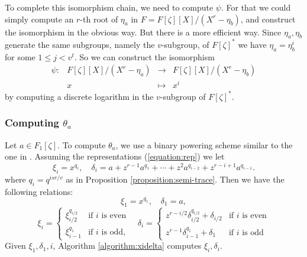 \documentclass[12pt]{article}
\theoremstyle{plain}
\theoremstyle{definition}
\newcounter{algorithm}
\begin{document}
To complete this isomorphism chain, we need to compute $\psi$. For that we could simply compute an 
$r$-th root of $\eta_a$ in $F = F[\zeta][X] / (X^r - \eta_b)$, and construct the 
isomorphism in the obvious way. But there is a more efficient way. Since $\eta_a, \eta_b$ generate 
the same subgroups, namely the $v$-subgroup, of $F[\zeta]^*$ we have $\eta_a = \eta_b^i$ for some 
$1 \le j < v^t$. So we can construct the isomorphism
\begin{equation}
	\label{equation:middle-isom}
	\begin{array}{rrll}
	\psi: & F[\zeta][X] / (X^r - \eta_a) & \longrightarrow & F[\zeta][X] / (X^r - \eta_b) \\
	& x & \longmapsto & x^i
	\end{array}
\end{equation}
by computing a discrete logarithm in the $v$-subgroup of $F[\zeta]^*$.





\subsubsection{Computing $\theta_a$}

Let $a \in F_1[\zeta]$. To compute $\theta_a$, we use a binary powering scheme similar to the one 
in \cite{doliskanischost2011}. Assuming the representations (\ref{equation:rep}) we let 
\[
\xi_i = x^{q_i}, \quad
\delta_i = a + z^{r - 1}a^{q_1} + \cdots + z^2a^{q_{i - 2}} + z^{r - i + 1}a^{q_{i - 1}}.
\]
where $q_i = q^{isr/v}$ as in Proposition \ref{proposition:semi-trace}. Then we have the following 
relations:
\[\xi_1 = x^{q_1}, \quad \delta_1 = a, \]
\[
\xi_i =
\begin{cases}
\xi_{i / 2}^{q_{i / 2}} & \text{if $i$ is even}  \\
\xi_{i - 1}^{q_1} & \text{if $i$ is odd,}
\end{cases} \quad
\delta_i=
\begin{cases}
z^{r - i / 2}\delta_{i / 2}^{q_{i / 2}} + \delta_{i / 2} & \text{if $i$ is even} \\
z^{r - 1}\delta_{i - 1}^{q_1} + \delta_1 & \text{if $i$ is odd}
\end{cases}
\]
Given $\xi_1, \delta_1, i$, Algorithm \ref{algorithm:xidelta} computes $\xi_i, \delta_i$.
\end{document}
